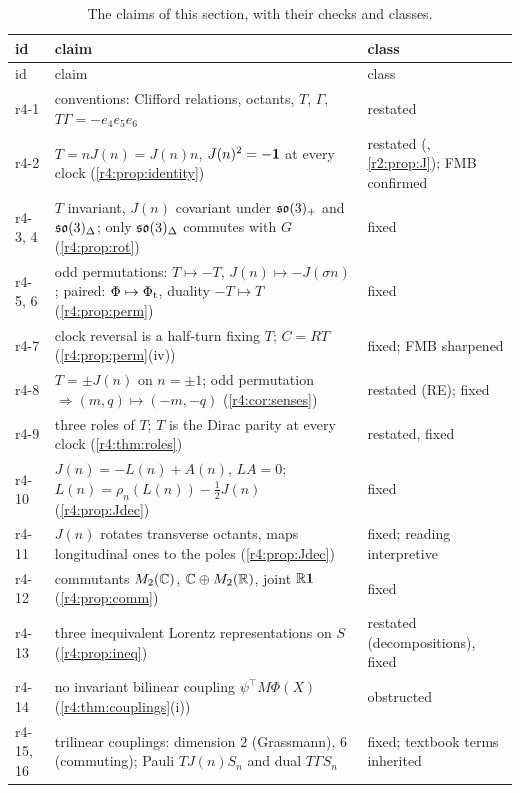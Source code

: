 {\small\renewcommand{\arraystretch}{1.12}
\begin{longtable}{@{}>{\raggedright\arraybackslash}p{}>{\raggedright\arraybackslash}p{}>{\raggedright\arraybackslash}p{}@{}}
\caption{The claims of this section, with their checks and classes.}\label{r4:tab:claims}\\
\toprule
id & claim & class\\
\midrule
\endfirsthead
\toprule
id & claim & class\\
\midrule
\endhead
r4-1 & conventions: Clifford relations, octants, $T$, $\Gamma$, $T\Gamma=-e_4e_5e_6$ & restated\\
r4-2 & $T=nJ(n)=J(n)n$, $J(n)^2=-\mathbf 1$ at every clock (\cref{r4:prop:identity}) & restated (\cite{ES17}, \cref{r2:prop:J}); FMB confirmed\\
r4-3, 4 & $T$ invariant, $J(n)$ covariant under $\mathfrak{so}(3)_+$ and $\mathfrak{so}(3)_\Delta$; only $\mathfrak{so}(3)_\Delta$ commutes with $G$ (\cref{r4:prop:rot}) & fixed\\
r4-5, 6 & odd permutations: $T\mapsto-T$, $J(n)\mapsto-J(\sigma n)$; paired: $\Phi\mapsto\Phi_{\rm t}$, duality $-T\mapsto T$ (\cref{r4:prop:perm}) & fixed\\
r4-7 & clock reversal is a half-turn fixing $T$; $C=RT$ (\cref{r4:prop:perm}(iv)) & fixed; FMB sharpened\\
r4-8 & $T=\pm J(n)$ on $n=\pm1$; odd permutation $\Rightarrow(m,q)\mapsto(-m,-q)$ (\cref{r4:cor:senses}) & restated (RE); fixed\\
r4-9 & three roles of $T$; $T$ is the Dirac parity at every clock (\cref{r4:thm:roles}) & restated, fixed\\
r4-10 & $J(n)=-L(n)+A(n)$, $LA=0$; $L(n)=\rho_n(L(n))-\tfrac12J(n)$ (\cref{r4:prop:Jdec}) & fixed\\
r4-11 & $J(n)$ rotates transverse octants, maps longitudinal ones to the poles (\cref{r4:prop:Jdec}) & fixed; reading interpretive\\
r4-12 & commutants $M_2(\mathbb{C})$, $\mathbb{C}\oplus M_2(\mathbb{R})$, joint $\mathbb{R}\mathbf 1$ (\cref{r4:prop:comm}) & fixed\\
r4-13 & three inequivalent Lorentz representations on $S$ (\cref{r4:prop:ineq}) & restated (decompositions), fixed\\
r4-14 & no invariant bilinear coupling $\psi^{\!\top}M\Phi(X)$ (\cref{r4:thm:couplings}(i)) & obstructed\\
r4-15, 16 & trilinear couplings: dimension $2$ (Grassmann), $6$ (commuting); Pauli $TJ(n)S_n$ and dual $T\Gamma S_n$ & fixed; textbook terms inherited\\

\end{longtable}}
